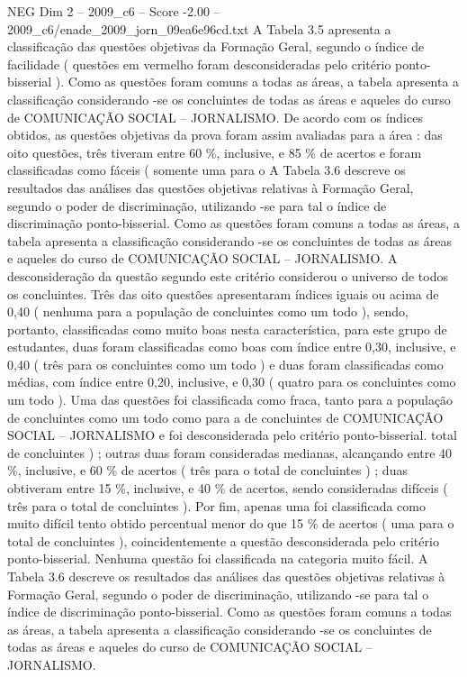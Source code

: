 \begin{textsample}{NEG Dim 2 – 2009\_c6 – Score -2.00 – 2009\_c6/enade\_2009\_jorn\_09ea6e96cd.txt}
A Tabela 3.5 apresenta a classificação das questões objetivas da Formação Geral, segundo o índice de facilidade ( questões em vermelho foram desconsideradas pelo critério ponto-bisserial ).
Como as questões foram comuns a todas as áreas, a tabela apresenta a classificação considerando -se os concluintes de todas as áreas e aqueles do curso de COMUNICAÇÃO SOCIAL – JORNALISMO.
De acordo com os índices obtidos, as questões objetivas da prova foram assim avaliadas para a área : das oito questões, três tiveram entre 60 \%, inclusive, e 85 \% de acertos e foram classificadas como fáceis ( somente uma para o A Tabela 3.6 descreve os resultados das análises das questões objetivas relativas à Formação Geral, segundo o poder de discriminação, utilizando -se para tal o índice de discriminação ponto-bisserial.
Como as questões foram comuns a todas as áreas, a tabela apresenta a classificação considerando -se os concluintes de todas as áreas e aqueles do curso de COMUNICAÇÃO SOCIAL – JORNALISMO.
A desconsideração da questão segundo este critério considerou o universo de todos os concluintes.
Três das oito questões apresentaram índices iguais ou acima de 0,40 ( nenhuma para a população de concluintes como um todo ), sendo, portanto, classificadas como muito boas nesta característica, para este grupo de estudantes, duas foram classificadas como boas com índice entre 0,30, inclusive, e 0,40 ( três para os concluintes como um todo ) e duas foram classificadas como médias, com índice entre 0,20, inclusive, e 0,30 ( quatro para os concluintes como um todo ).
Uma das questões foi classificada como fraca, tanto para a população de concluintes como um todo como para a de concluintes de COMUNICAÇÃO SOCIAL – JORNALISMO e foi desconsiderada pelo critério ponto-bisserial. total de concluintes ) ; outras duas foram consideradas medianas, alcançando entre 40 \%, inclusive, e 60 \% de acertos ( três para o total de concluintes ) ; duas obtiveram entre 15 \%, inclusive, e 40 \% de acertos, sendo consideradas difíceis ( três para o total de concluintes ).
Por fim, apenas uma foi classificada como muito difícil tento obtido percentual menor do que 15 \% de acertos ( uma para o total de concluintes ), coincidentemente a questão desconsiderada pelo critério ponto-bisserial.
Nenhuma questão foi classificada na categoria muito fácil.
A Tabela 3.6 descreve os resultados das análises das questões objetivas relativas à Formação Geral, segundo o poder de discriminação, utilizando -se para tal o índice de discriminação ponto-bisserial.
Como as questões foram comuns a todas as áreas, a tabela apresenta a classificação considerando -se os concluintes de todas as áreas e aqueles do curso de COMUNICAÇÃO SOCIAL – JORNALISMO.

\end{textsample}
